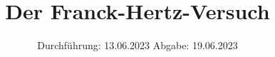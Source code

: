 

\subject{V601}
\title{Der Franck-Hertz-Versuch}
\date{%
  Durchführung: 13.06.2023
  \hspace{3em}
  Abgabe: 19.06.2023
}



\maketitle
\thispagestyle{empty}
\tableofcontents
\newpage
\setcounter{page}{1}





\printbibliography{}


